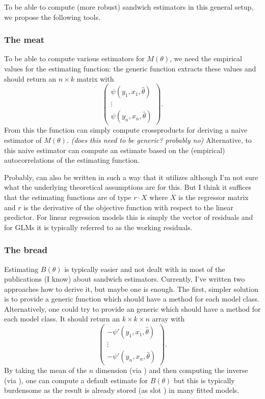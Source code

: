 \documentclass{Z}
\begin{document}
To be able to compute (more robust) sandwich estimators in this general setup, we
propose the following tools. 

\subsubsection*{The meat}

To be able to compute various estimators for $M(\theta)$, we need the empirical values
for the estimating function: the generic function  extracts these values
and should return an $n \times k$ matrix with
 \[ \left( \begin{array}{c} \psi(y_1, x_1, \hat \theta) \\ \vdots \\ \psi(y_n, x_n, \hat \theta)
    \end{array} \right). \]
From this the function  can simply compute crossproducts for deriving a naive
estimator of $M(\theta)$. \textit{(does this need to be generic? probably no)}
Alternative, to this naive estimator  can compute an estimate based on the
(empirical) autocorrelations of the estimating function.

Probably,  can also be written in such a way that it utilizes 
although I'm not sure what the underlying theoretical assumptions are for this. But I think
it suffices that the estimating functions are of type $r \cdot X$ where $X$ is the regressor
matrix and $r$ is the derivative of the objective function with respect to the linear predictor.
For linear regression models this is simply the vector of residuals and for GLMs it is typically
referred to as the working residuals.

\subsubsection*{The bread}

Estimating $B(\theta)$ is typically easier and not dealt with in most of the publications
(I know) about sandwich estimators. Currently, I've written two approaches how to derive it,
but maybe one is enough. The first, simpler solution is to provide a generic function
 which should have a method for each model class. Alternatively, one could
try to provide an  generic which should have a method for each model
class. It should return an $k \times k \times n$ array with
  \[ \left( \begin{array} {c} - \psi'(y_1, x_1, \hat \theta) \\ \vdots \\ - \psi'(y_n, x_n, \hat \theta)
     \end{array} \right). \]
By taking the mean of the $n$ dimension (via ) and then computing the inverse 
(via ), one can compute a default estimate for $B(\theta)$ but this is typically
burdensome as the result is already stored (as slot ) in many fitted models.
\end{document}
